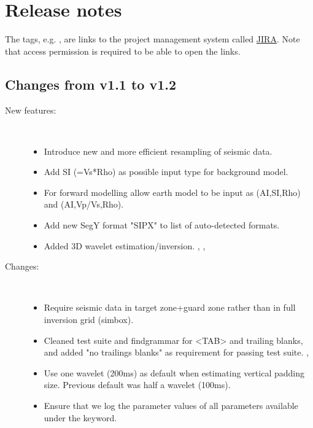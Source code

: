 \chapter{Release notes}
The tags, e.g. , are links to the \crava project management
system called
\href{http://www.atlassian.com/software/jira/}{JIRA}.
 Note that access permission is
required to be able to open the links.

\section{Changes from v1.1 to v1.2}

\begin{description}

\item [New features:] \mbox{ }
  \begin{itemize}
    \item Introduce new and more efficient resampling of seismic
      data. 
    \item Add SI (=Vs*Rho) as possible input type for background
      model. 
    \item For forward modelling allow earth model to be input as
      (AI,SI,Rho) and (AI,Vp/Vs,Rho). 
    \item Add new SegY format "SIPX" to list of auto-detected
      formats.
    \item Added 3D wavelet estimation/inversion. , ,
  \end{itemize}

\item [Changes:] \mbox{ }
  \begin{itemize}
    \item Require seismic data in target zone+guard zone rather than
      in full inversion grid (simbox). 
    \item Cleaned test suite and findgrammar for <TAB> and trailing
      blanks, and added "no trailings blanks" as requirement for passing
      test suite. , 
    \item Use one wavelet (200ms) as default when estimating vertical
      padding size. Previous default was half a wavelet
      (100ms). 
    \item Ensure that we log the parameter values of all parameters
      available under the  keyword. 
  \end{itemize}


\end{description}
